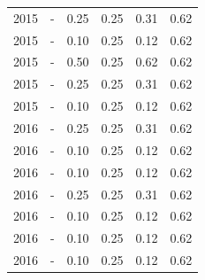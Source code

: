 \begin{table}[H]
\begin{tabular}{| l | c | c | c | c | c |}
            2015
          &
          -
          &
          0.25
          &
          0.25
          &
          0.31
          &
            {\color{blue} 0.62}
          \\
            2015
          &
          -
          &
          0.10
          &
          0.25
          &
          0.12
          &
            {\color{blue} 0.62}
          \\
            2015
          &
          -
          &
          0.50
          &
          0.25
          &
          0.62
          &
            {\color{blue} 0.62}
          \\
            2015
          &
          -
          &
          0.25
          &
          0.25
          &
          0.31
          &
            {\color{blue} 0.62}
          \\
            2015
          &
          -
          &
          0.10
          &
          0.25
          &
          0.12
          &
            {\color{blue} 0.62}
          \\
\hline
            2016
          &
          -
          &
          0.25
          &
          0.25
          &
          0.31
          &
            {\color{blue} 0.62}
          \\
            2016
          &
          -
          &
          0.10
          &
          0.25
          &
          0.12
          &
            {\color{blue} 0.62}
          \\
            2016
          &
          -
          &
          0.10
          &
          0.25
          &
          0.12
          &
            {\color{blue} 0.62}
          \\
            2016
          &
          -
          &
          0.25
          &
          0.25
          &
          0.31
          &
            {\color{blue} 0.62}
          \\
            2016
          &
          -
          &
          0.10
          &
          0.25
          &
          0.12
          &
            {\color{blue} 0.62}
          \\
            2016
          &
          -
          &
          0.10
          &
          0.25
          &
          0.12
          &
            {\color{blue} 0.62}
          \\
            2016
          &
          -
          &
          0.10
          &
          0.25
          &
          0.12
          &
            {\color{blue} 0.62}
          \\

\end{tabular}
\end{table}
